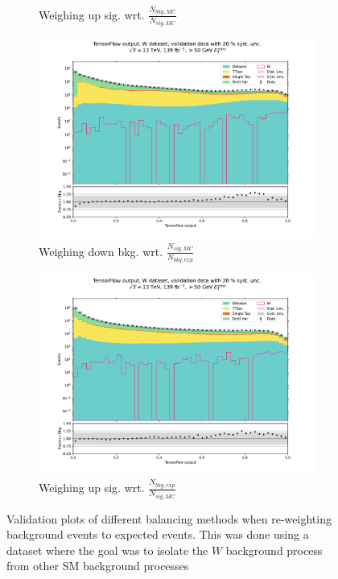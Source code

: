 \documentclass[12pt, a4paper]{book}
\begin{document}
\begin{figure}[!ht]
\begin{subfigure}[b]{0.49\textwidth}
        \caption{Weighing up sig. wrt. $\frac{N_{bkg,MC}}{N_{sig,MC}}$}
     \end{subfigure}
     \hfill
     \begin{subfigure}[b]{0.49\textwidth}
          \centering
          \includegraphics[width=1\textwidth]{bkg_exp/VAL.pdf}
          \caption{Weighing down bkg. wrt. $\frac{N_{sig,MC}}{N_{bkg,exp}}$ }
       \end{subfigure}
       \hfill
       \begin{subfigure}[b]{0.49\textwidth}
          \centering
          \includegraphics[width=1\textwidth]{sig_exp/VAL.pdf}
          \caption{Weighing up sig. wrt. $\frac{N_{bkg,exp}}{N_{sig,MC}}$}
       \end{subfigure}
     \caption[Validation plots for re-weighting background to expected events on NNs]{Validation plots of different balancing methods when re-weighting background events to expected events. 
     This was done using a dataset where the goal was to isolate the $W$ background process from other SM background processes} \label{fig:WVAL_rw}
\end{figure}
\end{document}
